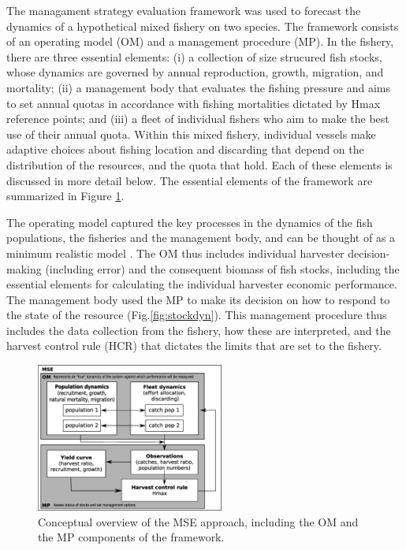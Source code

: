 \documentclass[12pt,oneline,a4paper,numbib]{ouparticle}
\numberwithin{equation}{subsection} %
\begin{document}
The managament strategy evaluation framework was used to forecast the dynamics of a hypothetical mixed fishery on two species. The framework consists of an operating model (OM) and a management procedure (MP). In the fishery, there are three essential elements: (i) a collection of size strucured fish stocks, whose dynamics are governed by annual reproduction, growth, migration, and mortality; (ii) a management body that evaluates the fishing pressure and aims to set annual quotas in accordance with fishing mortalities dictated by Hmax reference points; and (iii) a fleet of individual fishers who aim to make the best use of their annual quota. Within this mixed fishery, individual vessels make adaptive choices about fishing location and discarding that depend on the distribution of the resources, and the quota that hold. Each of these elements is discussed in more detail below. The essential elements of the framework are summarized in Figure \ref{fig:MSE}.

The operating model captured the key processes in the dynamics of the fish populations, the fisheries and the management body, and can be thought of as a minimum realistic model \cite{Punt1995}.  The OM thus includes individual harvester decision-making (including error) and the consequent biomass of fish stocks, including the essential elements for calculating the individual harvester economic performance. The management body used the MP to make its decision on how to respond to the state of the resource (Fig.\ref{fig:stockdyn}). This management procedure thus includes the data collection from the fishery, how these are interpreted, and the harvest control rule (HCR) that dictates the limits that are set to the fishery. 

 
\begin{figure}[!h]
\centering
\includegraphics[width=0.55\textwidth]{Figures/MSE.eps} 
\caption{Conceptual overview of the MSE approach, including the OM and the MP components of the framework.}
\label{fig:MSE}
\end{figure}
\end{document}
